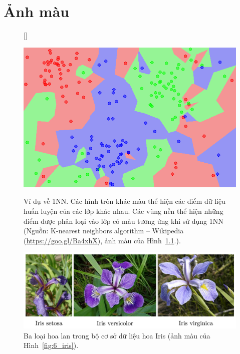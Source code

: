 
\chapter{Ảnh màu}
\label{apd:color}

\begin{figure}[]
[\FBwidth]
{\caption{
Ví dụ về 1NN. Các hình tròn khác màu thể hiện các điểm dữ liệu huấn luyện của các lớp khác nhau.  Các vùng nền thể hiện những điểm được phân
loại vào lớp có màu tương ứng khi sử dụng 1NN (Nguồn:
{K-nearest
neighbors algorithm  --  Wikipedia} (\url{https://goo.gl/Ba4xhX}), ảnh màu của Hình~\ref{fig:6_1nn_c}.).
}
\label{fig:6_1nn_c}}
{ %
\includegraphics[width=.5\textwidth]{Chapters/03_SimpleML/6_knn/Map1NN.png}
}
\end{figure}



\begin{figure}[]
\centering
\includegraphics[width = \textwidth]{Chapters/03_SimpleML/6_knn/iris.png}
\caption[]{Ba loại hoa lan trong bộ cơ sở dữ liệu hoa Iris (ảnh màu của Hình~\ref{fig:6_iris}).}
\label{fig:6_iris_c}
\end{figure}

